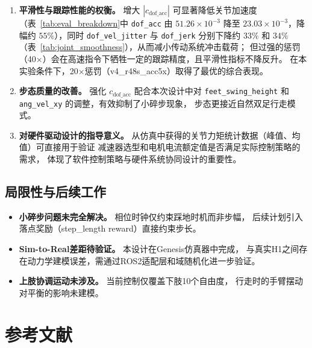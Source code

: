\documentclass[12pt, a4paper]{article}
\begin{document}
\begin{enumerate}
    \item \textbf{平滑性与跟踪性能的权衡。}
          增大 $|c_\text{dof\_acc}|$ 可显著降低关节加速度（表~\ref{tab:eval_breakdown}中
          \texttt{dof\_acc} 由 $51.26\times10^{-3}$ 降至 $23.03\times10^{-3}$，降幅约
          $55\%$），同时 \texttt{dof\_vel\_jitter} 与 \texttt{dof\_jerk} 分别下降约
          $33\%$ 和 $34\%$（表~\ref{tab:joint_smoothness}），从而减小传动系统冲击载荷；
          但过强的惩罚（40×）会在高速指令下牺牲一定的跟踪精度，且平滑性指标不降反升。
          在本实验条件下，20×惩罚（v4\_r48s\_acc5x）取得了最优的综合表现。

    \item \textbf{步态质量的改善。}
          强化 $c_\text{dof\_acc}$ 配合本次设计中对 \texttt{feet\_swing\_height}
          和 \texttt{ang\_vel\_xy} 的调整，有效抑制了小碎步现象，
          步态更接近自然双足行走模式。

    \item \textbf{对硬件驱动设计的指导意义。}
          从仿真中获得的关节力矩统计数据（峰值、均值）可直接用于验证
          减速器选型和电机电流额定值是否满足实际控制策略的需求，
          体现了软件控制策略与硬件系统协同设计的重要性。
\end{enumerate}

\subsection{局限性与后续工作}

\begin{itemize}
    \item \textbf{小碎步问题未完全解决。} 相位时钟仅约束踩地时机而非步幅，
          后续计划引入落点奖励（step\_length reward）直接约束步长。
    \item \textbf{Sim-to-Real差距待验证。} 本设计在Genesis仿真器中完成，
          与真实H1之间存在动力学建模误差，需通过ROS2适配层和域随机化进一步验证。
    \item \textbf{上肢协调运动未涉及。} 当前控制仅覆盖下肢10个自由度，
          行走时的手臂摆动对平衡的影响未建模。
\end{itemize}

\newpage

\section*{参考文献}
\end{document}
